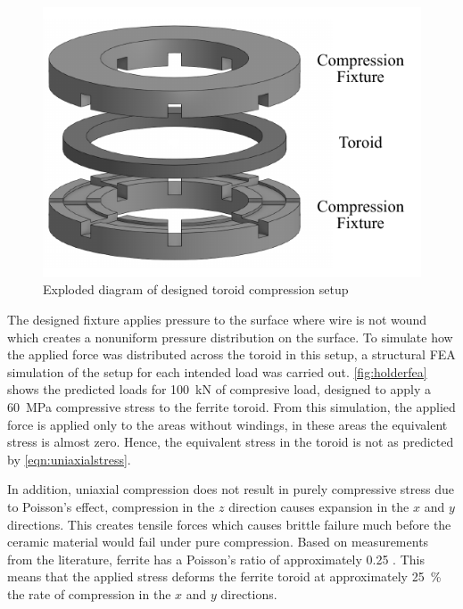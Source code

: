 \documentclass[conference]{IEEEtran}
\begin{document}
\begin{figure}
  \centering
  \includegraphics{figures/compressionholder.pdf}
  \caption{Exploded diagram of designed toroid compression setup}
  \label{fig:compressionholder}
\end{figure}

The designed fixture applies pressure to the surface where wire is not wound which creates a nonuniform pressure distribution on the surface. 
To simulate how the applied force was distributed across the toroid in this setup, a structural FEA simulation of the setup for each intended load was carried out. 
\cref{fig:holderfea} shows the predicted loads for \SI{100}{\kilo\newton} of compresive load, designed to apply a \SI{60}{\mega\pascal} compressive stress to the ferrite toroid.
From this simulation, the applied force is applied only to the areas without windings, in these areas the equivalent stress is almost zero. 
Hence, the equivalent stress in the toroid is not as predicted by \cref{eqn:uniaxialstress}. 

In addition, uniaxial compression does not result in purely compressive stress due to Poisson's effect, compression in the $z$ direction causes expansion in the $x$ and $y$ directions.
This creates tensile forces which causes brittle failure much before the ceramic material would fail under pure compression. 
Based on measurements from the literature, ferrite has a Poisson's ratio of approximately 0.25 \cite{moinuddinElasticBehaviourMnZn1993}.
This means that the applied stress deforms the ferrite toroid at approximately \SI{25}{\percent} the rate of compression in the $x$ and $y$ directions.
\end{document}
